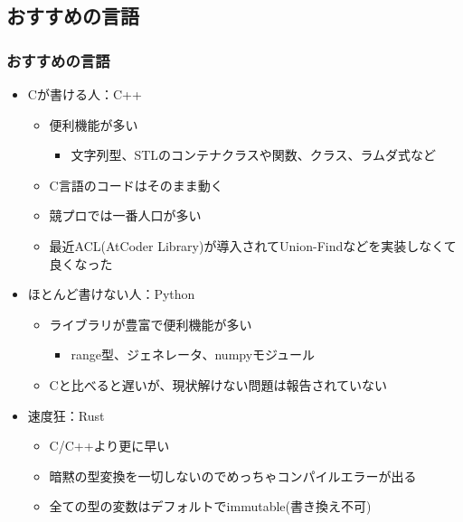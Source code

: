 \documentclass[t, aspectratio=169, dvipdfmx]{beamer}
\begin{document}
\subsection{おすすめの言語}
\begin{frame}
  \frametitle{おすすめの言語}
  \begin{itemize}
    \item Cが書ける人：C++
    \begin{itemize}
      \item 便利機能が多い
      \begin{itemize}
        \item 文字列型、STLのコンテナクラスや関数、クラス、ラムダ式など
      \end{itemize}
      \item C言語のコードはそのまま動く
      \item 競プロでは一番人口が多い
      \item 最近ACL(AtCoder Library)が導入されてUnion-Findなどを実装しなくて良くなった
    \end{itemize}
    \item ほとんど書けない人：Python
    \begin{itemize}
      \item ライブラリが豊富で便利機能が多い
      \begin{itemize}
        \item range型、ジェネレータ、numpyモジュール
      \end{itemize}
      \item Cと比べると遅いが、現状解けない問題は報告されていない
    \end{itemize}
    \item 速度狂：Rust
    \begin{itemize}
      \item C/C++より更に早い
      \item 暗黙の型変換を一切しないのでめっちゃコンパイルエラーが出る
      \item 全ての型の変数はデフォルトでimmutable(書き換え不可)
    \end{itemize}
  \end{itemize}
\end{frame}
\end{document}
